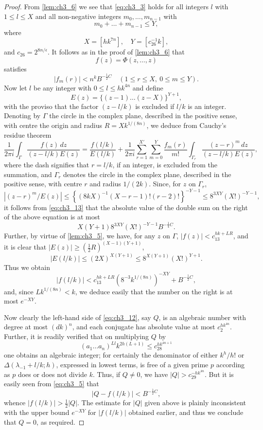 \begin{proof}
From \autoref{lem:ch3_6} we see that \eqref{eq:ch3_3} holds for all integers $l$ with $1 \le l \le X$ and all non-negative integers $m_0, \dots, m_{n-1}$ with
\[
m_0 + \dots + m_{n-1} \le Y,
\]
where
\[
X = [hk^{7n}], \quad Y = [c_{26}^{-1}k],
\]
and $c_{26} = 2^{8n/\epsilon}$. It follows as in the proof of \autoref{lem:ch3_6} that
\[
f(z) = \Phi(z, \dots, z)
\]
satisfies
\begin{equation} \label{eq:ch3_13}\tag{13}
|f_m(r)| < n^k B^{-\frac{1}{2}C} \quad (1 \le r \le X, \ 0 \le m \le Y).
\end{equation}
Now let $l$ be any integer with $0 \le l \le hk^{4n}$ and define
\[
E(z) = \{(z-1) \dots (z-X)\}^{Y+1},
\]
with the proviso that the factor $(z-l/k)$ is excluded if $l/k$ is an integer. Denoting by $\Gamma$ the circle in the complex plane, described in the positive sense, with centre the origin and radius $R = Xk^{1/(8n)}$, we deduce from Cauchy's residue theorem
\[
\frac{1}{2\pi i} \int_{\Gamma} \frac{f(z) \, dz}{(z - l/k) E(z)} = \frac{f(l/k)}{E(l/k)} + \frac{1}{2\pi i} \sum_{r=1}^{X'} \sum_{m=0}^Y \frac{f_m(r)}{m!} \int_{\Gamma_r} \frac{(z - r)^m \, dz}{(z - l/k) E(z)},
\]
where the dash signifies that $r=l/k$, if an integer, is excluded from the summation, and $\Gamma_r$ denotes the circle in the complex plane, described in the positive sense, with centre $r$ and radius $1/(2k)$. Since, for $z$ on $\Gamma_r$,
\[
\left| (z-r)^m/E(z) \right| \le \left\{ (8kX)^{-1} (X-r-1)! (r-2)! \right\}^{-Y-1} \le 8^{3XY} (X!)^{-Y-1},
\]
it follows from \eqref{eq:ch3_13} that the absolute value of the double sum on the right of the above equation is at most
\[
X(Y+1) 8^{3XY}(X!)^{-Y-1} B^{-\frac{1}{4}C}.
\]
Further, by virtue of \autoref{lem:ch3_5}, we have, for any $z$ on $\Gamma$, $|f(z)| < c_{13}^{hk+LR}$, and it is clear that $|E(z)| \ge (\frac{1}{2}R)^{(X-1)(Y+1)}$,
\[
|E(l/k)| \le (2X)^{X(Y+1)} \le 8^{X(Y+1)}(X!)^{Y+1}.
\]
Thus we obtain
\[
|f(l/k)| < c_{13}^{hk+LR} (8^{-3}k^{1/(8n)})^{-XY} + B^{-\frac{1}{2}C},
\]
and, since $Lk^{1/(8n)} < k$, we deduce easily that the number on the right is at most $e^{-XY}$.

Now clearly the left-hand side of \eqref{eq:ch3_12}, say $Q$, is an algebraic number with degree at most $(dk)^n$, and each conjugate has absolute value at most $c_2^{hk^{4n}}$. Further, it is readily verified that on multiplying $Q$ by
\[
(a_1 \dots a_n)^{Ll} k^{2h(L+1)} \le c_{28}^{hk^{4n+1}}
\]
one obtains an algebraic integer; for certainly the denominator of either $k^h/h!$ or $\Delta(\lambda_{-1}+l/k;h)$, expressed in lowest terms, is free of a given prime $p$ according as $p$ does or does not divide $k$. Thus, if $Q \neq 0$, we have $|Q| > c_{29}^{-hk^{4n}}$. But it is easily seen from \eqref{eq:ch3_5} that
\[
|Q - f(l/k)| < B^{-\frac{1}{2}C},
\]
whence $|f(l/k)| > \frac{1}{2}|Q|$. The estimate for $|Q|$ given above is plainly inconsistent with the upper bound $e^{-XY}$ for $|f(l/k)|$ obtained earlier, and thus we conclude that $Q = 0$, as required.
\end{proof}

